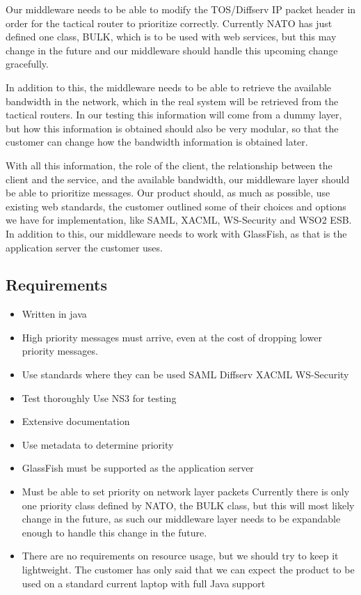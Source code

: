 \documentclass[12pt]{article}
\begin{document}
        Our middleware needs to be able to modify the TOS/Diffserv IP packet header in order for the tactical router to prioritize correctly. Currently NATO has just defined one class, BULK, which is to be used with web services, but this may change in the future and our middleware should handle this upcoming change gracefully.

        In addition to this, the middleware needs to be able to retrieve the available bandwidth in the network, which in the real system will be retrieved from the tactical routers. In our testing this information will come from a dummy layer, but how this information is obtained should also be very modular, so that the customer can change how the bandwidth information is obtained later.

        With all this information, the role of the client, the relationship between the client and the service, and the available bandwidth, our middleware layer should be able to prioritize messages. Our product should, as much as possible, use existing web standards, the customer outlined some of their choices and options we have for implementation, like SAML, XACML, WS-Security and WSO2 ESB. In addition to this, our middleware needs to work with GlassFish, as that is the application server the customer uses.
    \subsection{Requirements}\label{taskreq}
    \begin{itemize}
        \item Written in java
        \item High priority messages must arrive, even at the cost of dropping lower priority messages.
        \item Use standards where they can be used
            \subitem SAML
            \subitem Diffserv
            \subitem XACML
            \subitem WS-Security
        \item Test thoroughly
            \subitem Use NS3 for testing
        \item Extensive documentation
        \item Use metadata to determine priority
        \item GlassFish must be supported as the application server
        \item Must be able to set priority on network layer packets
            \subitem Currently there is only one priority class defined by NATO, the BULK class, but this will most likely change in the future, as such our middleware layer needs to be expandable enough to handle this change in the future.
        \item There are no requirements on resource usage, but we should try to keep it lightweight.
            \subitem The customer has only said that we can expect the product to be used on a standard current laptop with full Java support
    \end{itemize}
\end{document}
